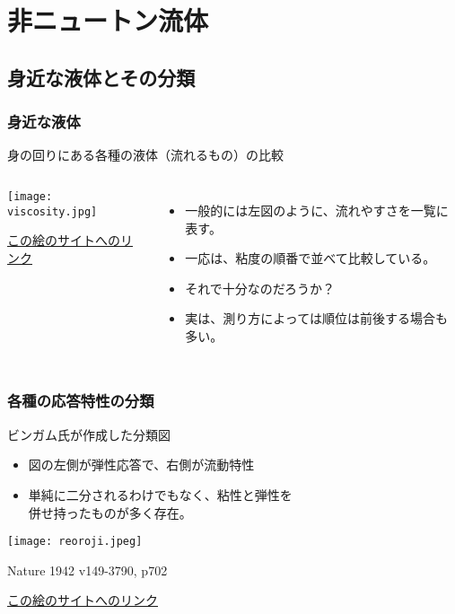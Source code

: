 \documentclass[12pt, dvipdfmx]{beamer}
\begin{document}
\section{非ニュートン流体}

\subsection{身近な液体とその分類}
\begin{frame}
	\frametitle{身近な液体}
		\begin{block}{身の回りにある各種の液体（流れるもの）の比較}
			\begin{columns}[T, onlytextwidth]
					\begin{center}
						\texttt{[image: viscosity.jpg]}
			
					\href{https://www.iwakipumps.jp/blog/naruhodo/08/}{この絵のサイトへのリンク}
					\end{center}
					\begin{itemize}
						\item 一般的には左図のように、流れやすさを一覧に表す。
						\item 一応は、粘度の順番で並べて比較している。
						\item それで十分なのだろうか？
						\item<2> \alert{実は、測り方によっては順位は前後する場合も多い。}
					\end{itemize}
			\end{columns}
		\end{block}
\end{frame}

\begin{frame}
	\frametitle{各種の応答特性の分類}
		\begin{block}{ビンガム氏が作成した分類図}
			\begin{itemize}
				\item 図の左側が弾性応答で、右側が流動特性
				\item 単純に二分されるわけでもなく、粘性と弾性を\\併せ持ったものが多く存在。
			\end{itemize}
				\begin{center}
					\texttt{[image: reoroji.jpeg]}

					Nature 1942 v149-3790, p702

					\href{http://rheology.jp/nagoya/2017/10/レオロジー的な物質の分類/}{この絵のサイトへのリンク}
				\end{center}
		\end{block}
\end{frame}
\end{document}
